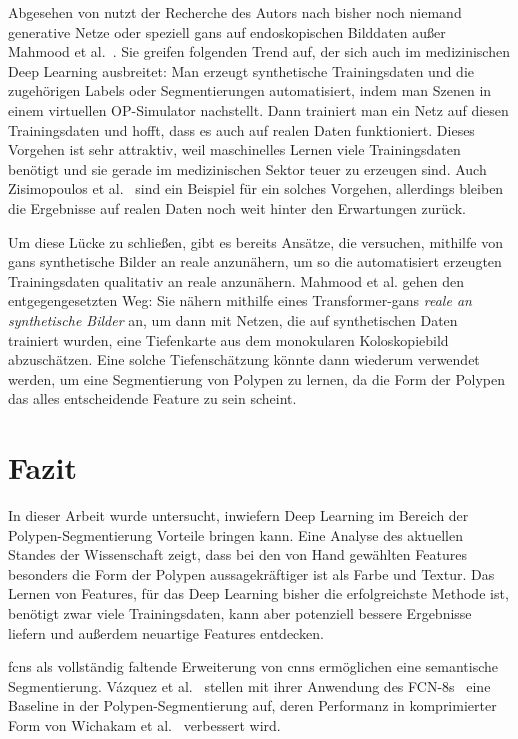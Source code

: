 Abgesehen von \cite{Zisimopoulos.2017} nutzt der Recherche des Autors nach bisher noch niemand generative Netze oder speziell \glspl{gan} auf endoskopischen Bilddaten außer Mahmood et al.~\cite{Mahmood.20171129}.
Sie greifen folgenden Trend auf, der sich auch im medizinischen Deep Learning ausbreitet:
Man erzeugt synthetische Trainingsdaten und die zugehörigen Labels oder Segmentierungen automatisiert, indem man Szenen in einem virtuellen OP-Simulator nachstellt.
Dann trainiert man ein Netz auf diesen Trainingsdaten und hofft, dass es auch auf realen Daten funktioniert.
Dieses Vorgehen ist sehr attraktiv, weil maschinelles Lernen viele Trainingsdaten benötigt und sie gerade im medizinischen Sektor teuer zu erzeugen sind.
Auch Zisimopoulos et al.~\cite{Zisimopoulos.2017} sind ein Beispiel für ein solches Vorgehen, allerdings bleiben die Ergebnisse auf realen Daten noch weit hinter den Erwartungen zurück.

Um diese Lücke zu schließen, gibt es bereits Ansätze, die versuchen, mithilfe von \glspl{gan} synthetische Bilder an reale anzunähern, um so die automatisiert erzeugten Trainingsdaten qualitativ an reale anzunähern.
Mahmood et al. gehen den entgegengesetzten Weg:
Sie nähern mithilfe eines Transformer-\gls{gan}s \emph{reale an synthetische Bilder} an, um dann mit Netzen, die auf synthetischen Daten trainiert wurden, eine Tiefenkarte aus dem monokularen Koloskopiebild abzuschätzen.
Eine solche Tiefenschätzung könnte dann wiederum verwendet werden, um eine Segmentierung von Polypen zu lernen, da die Form der Polypen das alles entscheidende Feature zu sein scheint.



\section{Fazit}

In dieser Arbeit wurde untersucht, inwiefern Deep Learning im Bereich der Polypen-Segmentierung Vorteile bringen kann.
Eine Analyse des aktuellen Standes der Wissenschaft zeigt, dass bei den von Hand gewählten Features besonders die Form der Polypen aussagekräftiger ist als Farbe und Textur.
Das Lernen von Features, für das Deep Learning bisher die erfolgreichste Methode ist, benötigt zwar viele Trainingsdaten, kann aber potenziell bessere Ergebnisse liefern und außerdem neuartige Features entdecken.

\glspl{fcn} als vollständig faltende Erweiterung von \glspl{cnn} ermöglichen eine semantische Segmentierung.
Vázquez et al.~\cite{Vazquez.2017} stellen mit ihrer Anwendung des FCN-8s~\cite{Long.2015} eine Baseline in der Polypen-Segmentierung auf, deren Performanz in komprimierter Form von Wichakam et al.~\cite{Wichakam.2018} verbessert wird.

